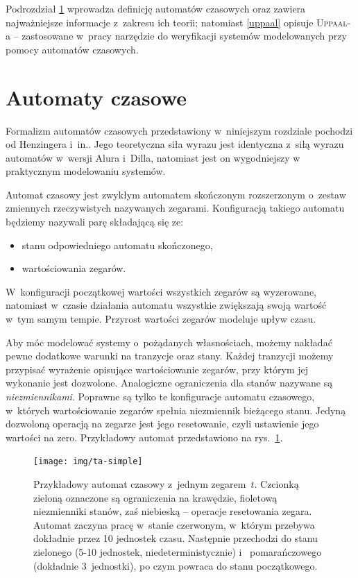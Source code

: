\documentclass{pracamgr}
\newcommand{\imgr}[1]{rys.~\ref{#1}}
\newcommand{\upp}{\textsc{Uppaal}}
\theoremstyle{plain}
\begin{document}
Podrozdział \ref{ta-theory} wprowadza definicję automatów czasowych
oraz zawiera najważniejsze informacje z~zakresu ich teorii;
natomiast \ref{uppaal} opisuje \upp-a -- zastosowane w~pracy narzędzie
do weryfikacji systemów modelowanych przy pomocy automatów czasowych.

\section{Automaty czasowe}
\label{ta-theory}

Formalizm automatów czasowych przedstawiony w~niniejszym
rozdziale pochodzi od  Henzingera i~in.\cite{henz-94}. Jego teoretyczna
siła wyrazu jest identyczna z~siłą wyrazu automatów w~wersji Alura
i~Dilla, natomiast jest on wygodniejszy w praktycznym modelowaniu
systemów.

Automat czasowy jest zwykłym automatem skończonym rozszerzonym
o~zestaw zmiennych rzeczywistych nazywanych zegarami. Konfiguracją
takiego automatu będziemy nazywali parę składającą się ze:
\begin{itemize}
  \item stanu odpowiedniego automatu skończonego,
  \item wartościowania zegarów.
\end{itemize}
W~konfiguracji początkowej wartości wszystkich zegarów są wyzerowane,
natomiast w~czasie działania automatu wszystkie zwiększają swoją wartość
w~tym samym tempie. Przyrost wartości zegarów modeluje upływ czasu.

Aby móc modelować systemy o~pożądanych własnościach, możemy nakładać
pewne dodatkowe warunki na tranzycje oraz stany. Każdej
tranzycji możemy przypisać wyrażenie opisujące wartościowanie zegarów,
przy którym jej wykonanie jest dozwolone. Analogiczne ograniczenia dla
stanów nazywane są \emph{niezmiennikami}. Poprawne są tylko te
konfiguracje automatu czasowego, w~których wartościowanie zegarów spełnia
niezmiennik bieżącego stanu. Jedyną dozwoloną operacją na zegarze
jest jego resetowanie, czyli ustawienie jego wartości na
zero. Przykładowy automat przedstawiono na \imgr{img:ta-simple}.

\begin{figure}
  \centering
  \texttt{[image: img/ta-simple]}
  \caption {Przykładowy automat czasowy z~jednym zegarem~$t$.
    Czcionką zieloną oznaczone są ograniczenia na krawędzie, fioletową
    niezmienniki stanów, zaś niebieską -- operacje resetowania
    zegara.\\ Automat zaczyna pracę w~stanie czerwonym, w~którym
    przebywa dokładnie przez 10 jednostek czasu. Następnie przechodzi
    do stanu zielonego (5-10 jednostek, niedeterministycznie)
i~    pomarańczowego (dokładnie 3~jednostki), po czym powraca do stanu
    początkowego.}
  \label{img:ta-simple}
\end{figure}
\end{document}
